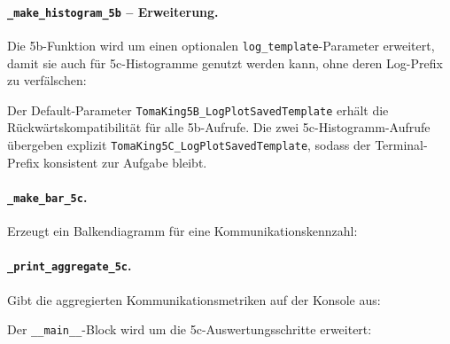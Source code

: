 \paragraph{\texttt{\_make\_histogram\_5b} -- Erweiterung.}
Die 5b-Funktion wird um einen optionalen \texttt{log\_template}-Parameter erweitert, damit sie auch für 5c-Histogramme genutzt werden kann, ohne deren Log-Prefix zu verfälschen:



Der Default-Parameter \texttt{TomaKing5B\_LogPlotSavedTemplate} erhält die Rückwärtskompatibilität für alle 5b-Aufrufe. Die zwei 5c-Histogramm-Aufrufe übergeben explizit \texttt{TomaKing5C\_LogPlotSavedTemplate}, sodass der Terminal-Prefix konsistent zur Aufgabe bleibt.

\paragraph{\texttt{\_make\_bar\_5c}.}
Erzeugt ein Balkendiagramm für eine Kommunikationskennzahl:



\paragraph{\texttt{\_print\_aggregate\_5c}.}
Gibt die aggregierten Kommunikationsmetriken auf der Konsole aus:




Der \texttt{\_\_main\_\_}-Block wird um die 5c-Auswertungsschritte erweitert:



